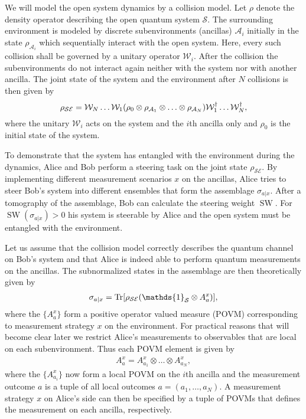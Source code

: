 \documentclass[aps,pra,twocolumn,superscriptaddress,showemail,showpacs,longbibliography]{revtex4-2}
\newcommand{\id}{\mathds{1}} %
\newcommand{\Sys}{\mathcal{S}} %
\newcommand{\Anc}{\mathcal{A}} %
\newcommand{\Env}{\mathcal{E}} %
\newcommand{\W}{\mathcal{W}}
\begin{document}
We will model the open system dynamics by a collision model. Let $\rho$ denote the density operator describing the open quantum system $\Sys$. The surrounding environment is modeled by discrete subenvironments (ancillas) $\Anc_i$ initially in the state $\rho_{\Anc_i}$ which sequentially interact with the open system. Here, every such collision shall be governed by a unitary operator $\W_i$. After the collision the subenvironments do not interact again neither with the system nor with another ancilla. The joint state of the system and the environment after $N$ collisions is then given by
\begin{equation}
    \rho_{\Sys\Env} = \W_N\ldots\W_1 \qty(\rho_0 \otimes \rho_{\Anc_1} \otimes\ldots\otimes\rho_{\Anc_N}) \W_1^\dagger\ldots\W_N^\dagger,
\end{equation}
where the unitary $\W_i$ acts on the system and the $i$th ancilla only and $\rho_0$ is the initial state of the system.

To demonstrate that the system has entangled with the environment during the dynamics, Alice and Bob perform a steering task on the joint state $\rho_{\Sys\Env}$. By implementing different measurement scenarios $x$ on the ancillas, Alice tries to steer Bob's system into different ensembles that form the assemblage $\sigma_{a|x}$. After a tomography of the assemblage, Bob can calculate the steering weight $\operatorname{SW}$. For $\operatorname{SW}(\sigma_{a|x}) >0$ his system is steerable by Alice and the open system must be entangled with the environment.

Let us assume that the collision model correctly describes the quantum channel on Bob's system and that Alice is indeed able to perform quantum measurements on the ancillas. The subnormalized states in the assemblage are then theoretically given by
\begin{align}
    \sigma_{a|x} = \Tr[\rho_{\Sys\Env} (\id_\Sys \otimes A^x_a)],
\end{align}
where the $\{A^x_a\}$ form a positive operator valued measure (POVM) corresponding to measurement strategy $x$ on the environment. For practical reasons that will become clear later we restrict Alice's measurements to observables that are local on each subenvironment. Thus each POVM element is given by 
\begin{align}
    A^x_a = A^x_{a_1} \otimes \ldots \otimes A^x_{a_N},
\end{align}
where the $\{A^x_{a_i}\}$ now form a local POVM on the $i$th ancilla and the measurement outcome $a$ is a tuple of all local outcomes $a = (a_1,\ldots,a_N)$.
A measurement strategy $x$ on Alice's side can then be specified by a tuple of POVMs that defines the measurement on each ancilla, respectively.
\end{document}
